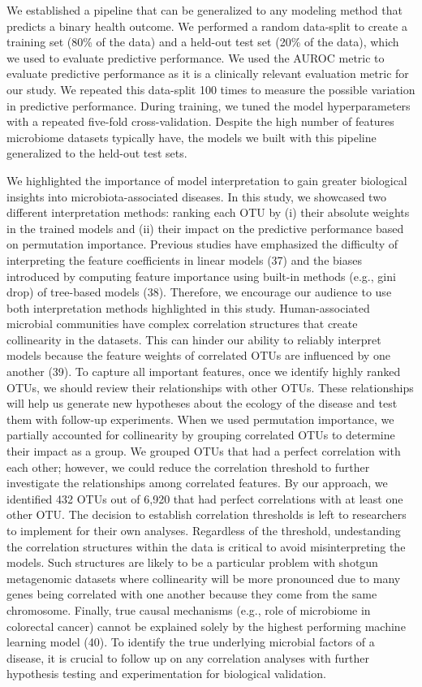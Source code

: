\documentclass[11pt,]{article}
\begin{document}
We established a pipeline that can be generalized to any modeling method
that predicts a binary health outcome. We performed a random data-split
to create a training set (80\% of the data) and a held-out test set
(20\% of the data), which we used to evaluate predictive performance. We
used the AUROC metric to evaluate predictive performance as it is a
clinically relevant evaluation metric for our study. We repeated this
data-split 100 times to measure the possible variation in predictive
performance. During training, we tuned the model hyperparameters with a
repeated five-fold cross-validation. Despite the high number of features
microbiome datasets typically have, the models we built with this
pipeline generalized to the held-out test sets.

We highlighted the importance of model interpretation to gain greater
biological insights into microbiota-associated diseases. In this study,
we showcased two different interpretation methods: ranking each OTU by
(i) their absolute weights in the trained models and (ii) their impact
on the predictive performance based on permutation importance. Previous
studies have emphasized the difficulty of interpreting the feature
coefficients in linear models (37) and the biases introduced by
computing feature importance using built-in methods (e.g., gini drop) of
tree-based models (38). Therefore, we encourage our audience to use both
interpretation methods highlighted in this study. Human-associated
microbial communities have complex correlation structures that create
collinearity in the datasets. This can hinder our ability to reliably
interpret models because the feature weights of correlated OTUs are
influenced by one another (39). To capture all important features, once
we identify highly ranked OTUs, we should review their relationships
with other OTUs. These relationships will help us generate new
hypotheses about the ecology of the disease and test them with follow-up
experiments. When we used permutation importance, we partially accounted
for collinearity by grouping correlated OTUs to determine their impact
as a group. We grouped OTUs that had a perfect correlation with each
other; however, we could reduce the correlation threshold to further
investigate the relationships among correlated features. By our
approach, we identified 432 OTUs out of 6,920 that had perfect
correlations with at least one other OTU. The decision to establish
correlation thresholds is left to researchers to implement for their own
analyses. Regardless of the threshold, undestanding the correlation
structures within the data is critical to avoid misinterpreting the
models. Such structures are likely to be a particular problem with
shotgun metagenomic datasets where collinearity will be more pronounced
due to many genes being correlated with one another because they come
from the same chromosome. Finally, true causal mechanisms (e.g., role of
microbiome in colorectal cancer) cannot be explained solely by the
highest performing machine learning model (40). To identify the true
underlying microbial factors of a disease, it is crucial to follow up on
any correlation analyses with further hypothesis testing and
experimentation for biological validation.
\end{document}
